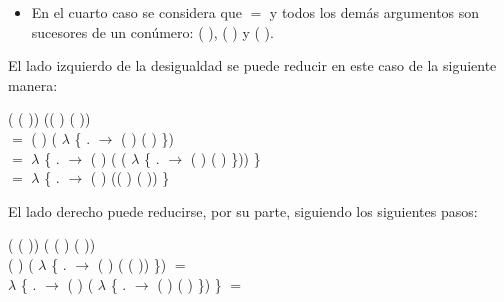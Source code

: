 \begin{AgdaAlign}
\begin{itemize}
\item En el cuarto caso se considera que  $=$  y todos los demás argumentos son sucesores de un conúmero: ( ), ( ) y ( ).
\end{itemize}

El lado izquierdo de la desigualdad se puede reducir en este caso de la siguiente manera: 

 ( \AgdaFunction{+} ( )) (( ) \AgdaFunction{+} ( )) \\
$=$  ( ) ( $\lambda$ \{ . $\rightarrow$ ( ) \AgdaFunction{+} ( ) \}) \\
$=$  $\lambda$ \{ . $\rightarrow$  ( ) ( ( $\lambda$ \{ . $\rightarrow$ ( ) \AgdaFunction{+} ( ) \})) \} \\
$=$  $\lambda$ \{ . $\rightarrow$  ( ) (( ) \AgdaFunction{+} ( )) \} 

El lado derecho puede reducirse, por su parte, siguiendo los siguientes pasos:
\begin{flushright}
(  ( )) \AgdaFunction{+} ( ( ) ( )) \\
( ) \AgdaFunction{+} ( $\lambda$ \{ . $\rightarrow$  ( ) ( ( )) \}) $=$ \\
 $\lambda$ \{ . $\rightarrow$ ( ) \AgdaFunction{+} ( $\lambda$ \{ . $\rightarrow$  ( ) ( ) \}) \} $=$
\end{flushright}


\end{AgdaAlign}

